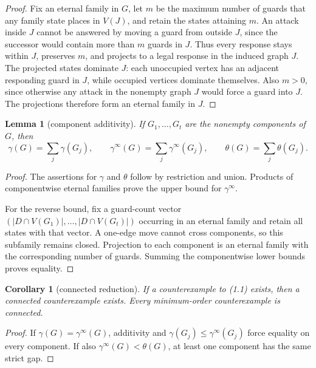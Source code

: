 \documentclass[11pt]{article}
\newtheorem{lemma}[theorem]{Lemma}
\newtheorem{corollary}[theorem]{Corollary}
\theoremstyle{definition}
\theoremstyle{remark}
\newcommand{\gaminf}{\gamma^{\infty}}
\newcommand{\V}{V}
\begin{document}
\begin{proof}
Fix an eternal family in \(G\), let \(m\) be the maximum number of guards
that any family state places in \(\V(J)\), and retain the states attaining
\(m\).  An attack inside \(J\) cannot be answered by moving a guard from
outside \(J\), since the successor would contain more than \(m\) guards in
\(J\).  Thus every response stays within \(J\), preserves \(m\), and
projects to a legal response in the induced graph \(J\).  The projected
states dominate \(J\): each unoccupied vertex has an adjacent responding
guard in \(J\), while occupied vertices dominate themselves.  Also
\(m>0\), since otherwise any attack in the nonempty graph \(J\) would force
a guard into \(J\).  The projections therefore form an eternal family in
\(J\).
\end{proof}

\begin{lemma}[component additivity]\label{lem:additivity}
If \(G_1,\ldots,G_t\) are the nonempty components of \(G\), then
\[
 \gamma(G)=\sum_j\gamma(G_j),\qquad
 \gaminf(G)=\sum_j\gaminf(G_j),\qquad
 \theta(G)=\sum_j\theta(G_j).
\tag{2.5}
\]
\end{lemma}

\begin{proof}
The assertions for \(\gamma\) and \(\theta\) follow by restriction and
union.  Products of componentwise eternal families prove the upper bound
for \(\gaminf\).

For the reverse bound, fix a guard-count vector
\((|D\cap\V(G_1)|,\ldots,|D\cap\V(G_t)|)\) occurring in an eternal family
and retain all states with that vector.  A one-edge move cannot cross
components, so this subfamily remains closed.  Projection to each component
is an eternal family with the corresponding number of guards.  Summing the
componentwise lower bounds proves equality.
\end{proof}

\begin{corollary}[connected reduction]\label{cor:connected}
If a counterexample to \emph{(1.1)} exists, then a connected counterexample
exists.  Every minimum-order counterexample is connected.
\end{corollary}

\begin{proof}
If \(\gamma(G)=\gaminf(G)\), additivity and
\(\gamma(G_j)\leq\gaminf(G_j)\) force equality on every component.  If also
\(\gaminf(G)<\theta(G)\), at least one component has the same strict gap.
\end{proof}
\end{document}

